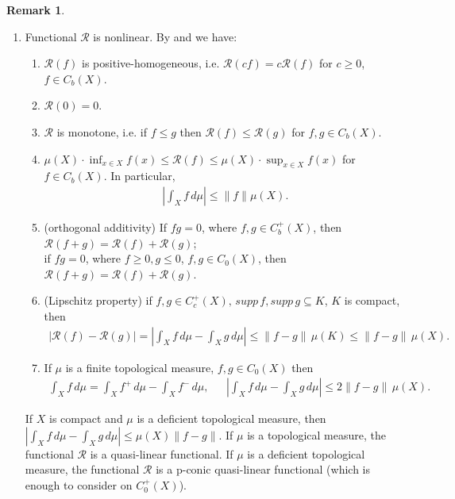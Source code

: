 \documentclass[sn-mathphys-num]{sn-jnl}%
\theoremstyle{thmstyleone}%
\theoremstyle{definition}
\newtheorem{remark}[theorem]{Remark}
\begin{document}
\begin{remark}
\begin{enumerate} [leftmargin=0.2in, label=(\Roman*),ref=(\Roman*)]
\begin{align*}
\end{align*}
If $\mu$ is a topological measure we may write $m = m_{f, \mu}$ instead of $r$.
\item  \label{RHOsvva}
Functional $\mathcal{R} $ is nonlinear. 
By \cite[L. 7.7,  Th. 7.10, L. 3.6, L. 7.12, Th. 8.7]{Butler:ReprDTM}  and  \cite[Cor. 4.10]{Butler:QLFLC} we have:
\begin{enumerate}[leftmargin=*]
\item
$\mathcal{R} (f) $ is positive-homogeneous, i.e. $\mathcal{R} (cf)  = c \mathcal{R} (f) $ for $c \ge 0$, $ f \in C_b(X)$. 
\item
$\mathcal{R} (0) =0$. 
\item 
$\mathcal{R}$ is monotone, i.e. if $ f \le g$  then $\mathcal{R} (f) \le \mathcal{R} (g)$ for $f, g \in C_b(X)$.
\item
$ \mu(X)  \cdot \inf_{x \in X} f(x)  \le \mathcal{R}(f)  \le \mu(X) \cdot \sup _{x \in X} f(x) $ for $f \in C_b(X)$. 
In particular, 
\begin{align} \label{estin}
  | \int_X f \, d\mu | \le \|f \| \mu(X).
\end{align}
\item
(orthogonal additivity) If $f g = 0$, where  $f, g \in C_b^+(X)$,  then $\mathcal{R} (f+g) = \mathcal{R} (f) + \mathcal{R} (g)$; \\
if $f g = 0 $, where $f \ge 0, g \le 0$, $f, g \in C_0(X)$, then $\mathcal{R} (f+g) = \mathcal{R} (f) + \mathcal{R} (g)$.
\item
(Lipschitz property)
if $f, g \in C_c^+(X), \, supp \, f, supp \, g \subseteq K$, $K$ is compact, then 
\begin{align} \label{LipCc} 
 | \mathcal{R}(f) - \mathcal{R}(g) |  = |  \int_X f \, d\mu - \int_X g \, d\mu | \le \| f - g \| \, \mu(K) \le \| f - g \| \, \mu(X). 
\end{align} 
\item 
If $ \mu$ is a finite topological measure,  $f, g \in C_0(X)$ then
\begin{align*} 
 \int_X f \, d\mu = \int_X f^+ \, d\mu - \int_X f^- \, d\mu, \ \  \ \ \ \ \ 
|\int_X f \, d\mu - \int_X g \, d\mu | \le  2 \| f - g \| \, \mu(X).
\end{align*}

\end{enumerate}
If $X$ is compact and  $\mu$ is a deficient topological measure, then 
$ |  \int_X f \, d\mu - \int_X g \, d\mu | \le \mu(X)  \| f - g \|. $
If $ \mu$ is a topological measure, the functional $ \mathcal{R}$ is a quasi-linear functional. 
If $ \mu$ is a deficient topological measure, the functional $ \mathcal{R}$ is a p-conic quasi-linear functional (which is enough to consider on $C_0^+(X)$).


\end{enumerate}
\end{remark}
\end{document}
